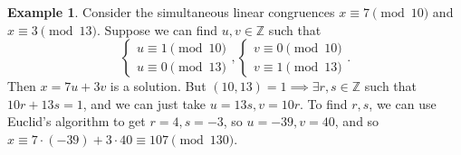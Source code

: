 \documentclass{article}
\theoremstyle{definition}
\newtheorem{example}{Example}[section]
\begin{document}
\begin{example}
    Consider the simultaneous linear congruences $x \equiv 7 \pmod{10}$ and $x \equiv 3 \pmod{13}$. Suppose we can find $u,v \in \mathbb{Z}$ such that \[
    \begin{cases}
        u \equiv 1 \pmod{10}\\
        u \equiv 0 \pmod{13}
    \end{cases},
    \begin{cases}
        v \equiv 0 \pmod{10}\\
        v \equiv 1 \pmod{13}
    \end{cases}.
    \]
    Then $x = 7u + 3v$ is a solution. But $(10,13) = 1 \implies \exists r,s \in \mathbb{Z}$ such that $10r+13s = 1$, and we can just take $u = 13s, v = 10r$. To find $r,s$, we can use Euclid's algorithm to get $r=4, s= -3$, so $u = -39, v = 40$, and so $x \equiv 7 \cdot (-39) + 3 \cdot 40 \equiv 107 \pmod{130}$.
\end{example}

\end{document}
